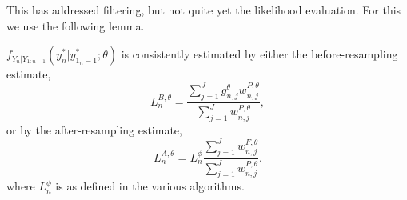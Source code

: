 

This has addressed filtering, but not quite yet the likelihood evaluation. For this we use the following lemma.

\begin{lem}
    \label{lem:lik-proper-weight}
  $f_{Y_n|Y_{1:n-1}}(y_n^*|y_{1_n-1}^*;\theta)$ is consistently estimated by either the before-resampling estimate,
\begin{equation}\label{L1}
L_n^{B,\theta} =  \frac{\sum_{j=1}^Jg^\theta_{n,j} w^{P,\theta}_{n,j}}{\sum_{j=1}^J  w^{P,\theta}_{n,j}},
\end{equation}
or by the after-resampling estimate,
\begin{equation}\label{L2}
L_n^{A,\theta} = L^\phi_n \frac{\sum_{j=1}^Jw^{F,\theta}_{n,j}}{\sum_{j=1}^J  w^{P,\theta}_{n,j}}.
\end{equation}
where $L^\phi_n$ is as defined in the various algorithms.
\end{lem}

